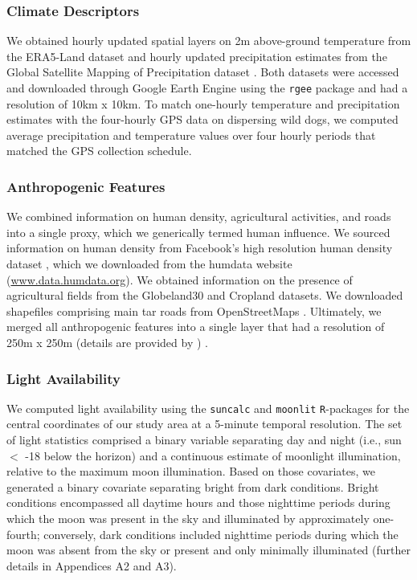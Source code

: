 \documentclass[../FinalThesis.tex]{subfiles}
\begin{document}
\subsubsection{Climate Descriptors}

We obtained hourly updated spatial layers on 2m above-ground temperature from
the ERA5-Land dataset \citep{Munoz-Sabater.2021} and hourly updated
precipitation estimates from the Global Satellite Mapping of Precipitation
dataset \citep{Kubota.2020}. Both datasets were accessed and downloaded through
Google Earth Engine \citep{Gorelick.2017} using the \texttt{rgee} package
\citep{Aybar.2024} and had a resolution of 10km x 10km. To match one-hourly
temperature and precipitation estimates with the four-hourly GPS data on
dispersing wild dogs, we computed average precipitation and temperature values
over four hourly periods that matched the GPS collection schedule.

\subsubsection{Anthropogenic Features}

We combined information on human density, agricultural activities, and roads
into a single proxy, which we generically termed human influence. We sourced
information on human density from Facebook's high resolution human density
dataset \citep{Tiecke.2017}, which we downloaded from the humdata website
(\url{www.data.humdata.org}). We obtained information on the presence of
agricultural fields from the Globeland30 \citep{Chen.2015} and Cropland
\citep{Xiong.2017} datasets. We  downloaded shapefiles comprising main tar roads
from OpenStreetMaps \citep{OpenStreetMapContributors.2017}. Ultimately, we
merged all anthropogenic features into a single layer that had a resolution of
250m x 250m (details are provided by \citealp{Hofmann.2021}) .

\subsubsection{Light Availability}

We computed light availability using the \texttt{suncalc} and \texttt{moonlit}
\texttt{R}-packages \citep{Thieurmel.2022, Smielak.2023} for the central
coordinates of our study area at a 5-minute temporal resolution. The set of
light statistics comprised a binary variable separating day and night (i.e., sun
$<$ -18 \degree below the horizon) and a continuous estimate of moonlight
illumination, relative to the maximum moon illumination. Based on those
covariates, we generated a binary covariate separating bright from dark
conditions. Bright conditions encompassed all daytime hours and those nighttime
periods during which the moon was present in the sky and illuminated by
approximately one-fourth; conversely, dark conditions included nighttime periods
during which the moon was absent from the sky or present and only minimally
illuminated (further details in Appendices A2 and A3).
\end{document}
